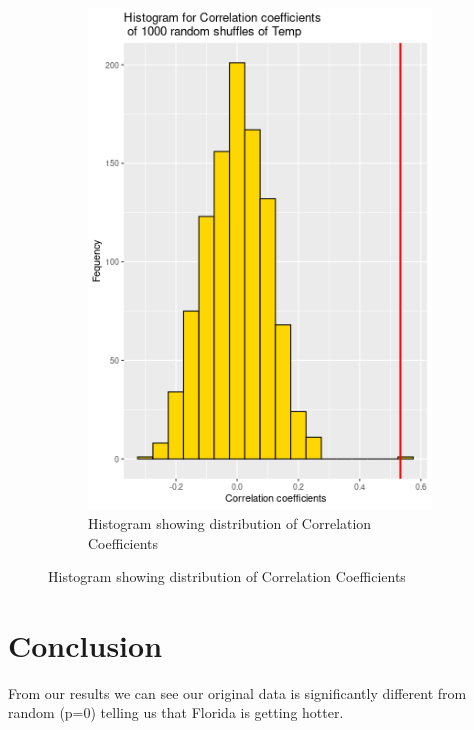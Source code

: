 \documentclass{article}
\begin{document}
\begin{figure}[htp]
\begin{subfigure}[b]{0.4\textwidth}
        \label{fig:KWAMT plot}
    \end{subfigure}
    \hfill
      \begin{subfigure}[b]{0.4\textwidth}
          \includegraphics[width=\textwidth]{CorrelationFrequency.png}
         \caption{Histogram showing distribution of Correlation Coefficients}
        \label{fig:Coefficient histogram}
    \end{subfigure}
  
   
    
\end{figure}

\section{Conclusion}
From our results we can see our original data is significantly different from random (p=0) telling us that Florida is getting hotter.
\end{document}
